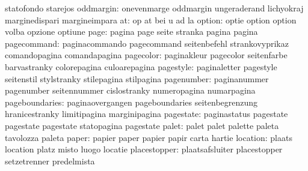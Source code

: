                            statofondo                starejos
                oddmargin: onevenmarge               oddmargin
                           ungeraderand              lichyokraj
                           marginedispari            margineimpara
                       at: op                        at
                           bei                       u
                           ad                        la
                   option: optie                     option
                           option                    volba
                           opzione                   optiune
                     page: pagina                    page
                           seite                     stranka
                           pagina                    pagina
              pagecommand: paginacommando            pagecommand
                           seitenbefehl              strankovyprikaz
                           comandopagina             comandapagina
                pagecolor: paginakleur               pagecolor
                           seitenfarbe               barvastranky
                           colorepagina              culoarepagina
                pagestyle: paginaletter              pagestyle
                           seitenstil                stylstranky
                           stilepagina               stilpagina
               pagenumber: paginanummer              pagenumber
                           seitennummer              cislostranky
                           numeropagina              numarpagina
           pageboundaries: paginaovergangen          pageboundaries
                           seitenbegrenzung          hranicestranky
                           limitipagina              marginipagina
                pagestate: paginastatus              pagestate
                           pagestate                 pagestate
                           statopagina               pagestate %
                    palet: palet                     palet
                           palette                   paleta
                           tavolozza                 paleta
                    paper: papier                    paper
                           papier                    papir
                           carta                     hartie
                 location: plaats                    location
                           platz                     misto
                           luogo                     locatie
             placestopper: plaatsafsluiter           placestopper
                           setzetrenner              predelmista
